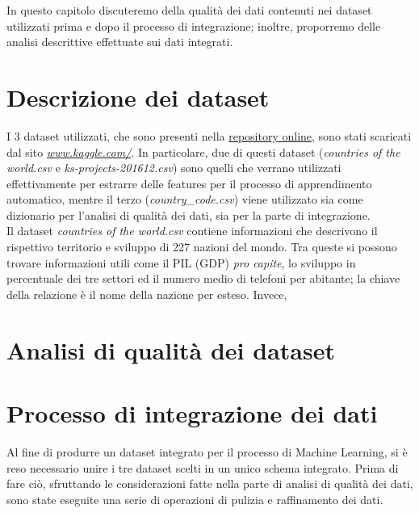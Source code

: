In questo capitolo discuteremo della qualità dei dati contenuti nei dataset utilizzati prima e dopo il processo di integrazione; inoltre, proporremo delle analisi descrittive effettuate sui dati integrati. 
\section{Descrizione dei dataset}
I 3 dataset utilizzati, che sono presenti nella \href{https://gitlab.com/Daniele-Papetti/kickstarterprediction}{repository online}, sono stati scaricati dal sito \href{https://www.kaggle.com/}{\emph{www.kaggle.com/}}.
In particolare, due di questi dataset (\textit{countries of the world.csv} e \textit{ks-projects-201612.csv}) sono quelli che verrano utilizzati effettivamente per estrarre delle features per il processo di apprendimento automatico, mentre il terzo (\textit{country\_code.csv}) viene utilizzato sia come dizionario per l'analisi di qualità dei dati, sia per la parte di integrazione.\\
Il dataset \textit{countries of the world.csv} contiene informazioni che descrivono il rispettivo territorio e sviluppo di 227 nazioni del mondo.
Tra queste si possono trovare informazioni utili come il PIL (GDP) \textit{pro capite}, lo sviluppo in percentuale dei tre settori ed il numero medio di telefoni per abitante; la chiave della relazione è il nome della nazione per esteso.
Invece, 

\section{Analisi di qualità dei dataset}

\section{Processo di integrazione dei dati}
Al fine di produrre un dataset integrato per il processo di Machine Learning, si è reso necessario unire i tre dataset scelti in un unico schema integrato. Prima di fare ciò, sfruttando le considerazioni fatte nella parte di analisi di qualità dei dati, sono state eseguite una serie di operazioni di pulizia e raffinamento dei dati.\\
